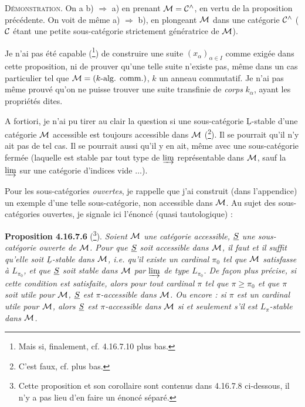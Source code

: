 \textsc{Démonstration}. On a b) $\Longrightarrow$ a) en prenant $\mathcal{M} = \mathcal{C}^\wedge$, en vertu de la proposition précédente. On voit de même a) $\Longrightarrow$ b), en plongeant $\mathcal{M}$ dans une catégorie $\mathcal{C}^\wedge$ ($\mathcal{C}$ étant une petite sous-catégorie strictement génératrice de $\mathcal{M}$).

Je n'ai pas été capable (\footnote{Mais si, finalement, cf. 4.16.7.10 plus bas.}) de construire une suite $(x_\alpha)_{\alpha\in I}$ comme exigée dans cette proposition, ni de prouver qu'une telle suite n'existe pas, même dans un cas particulier tel que $\mathcal{M} = (k\text{-alg. comm.})$, $k$ un anneau commutatif. Je n'ai pas
même prouvé qu'on ne puisse trouver une suite transfinie de \textit{corps} $k_\alpha$, ayant les propriétés dites.

A fortiori, je n'ai pu tirer au clair la question si une sous-catégorie $\underline{\mathrm{L}}$-stable d'une catégorie $\mathcal{M}$ accessible est toujours accessible dans $\mathcal{M}$ (\footnote{C'est faux, cf. plus bas.}). Il se pourrait qu'il n'y ait pas de tel cas. Il se pourrait aussi qu'il y en ait, même avec une sous-catégorie fermée (laquelle est stable par tout type de $\varinjlim$ représentable dans $\mathcal{M}$, sauf la $\varinjlim$ sur une catégorie d'indices vide $\ldots$).


Pour les sous-catégories \textit{ouvertes}, je rappelle que j'ai construit (dans l'appendice) un exemple d'une telle sous-catégorie, non accessible dans $\mathcal{M}$. Au sujet des sous-catégories ouvertes, je signale ici l'énoncé (quasi tautologique) :

\textbf{Proposition 4.16.7.6} (\footnote{Cette proposition et son corollaire sont contenus dans 4.16.7.8 ci-dessous, il n'y a pas lieu d'en faire un énoncé séparé.}). \textit{Soient $\mathcal{M}$ une catégorie accessible, $\underline{S}$ une sous-catégorie \textup{ouverte} de $\mathcal{M}$. Pour que $\underline{S}$ soit accessible dans $\mathcal{M}$, il faut et il suffit qu'elle soit $\underline{L}$-stable dans $\mathcal{M}$, i.e. qu'il existe un cardinal $\pi_0$ tel que $\mathcal{M}$ satisfasse à $L_{\pi_0}$, et que $\underline{S}$ soit stable dans $\mathcal{M}$ par $\varinjlim$ de type $L_{\pi_0}$. De façon plus précise, si cette condition est satisfaite, alors pour tout cardinal $\pi$ tel que $\pi \geqslant \pi_0$ et que $\pi$ soit utile pour $\mathcal{M}$, $\underline{S}$ est $\pi$-accessible dans $\mathcal{M}$. Ou encore : si $\pi$ est un cardinal utile pour $\mathcal{M}$, alors $\underline{S}$ est $\pi$-accessible dans $\mathcal{M}$ si et seulement s'il est $L_\pi$-stable dans $\mathcal{M}$.}

